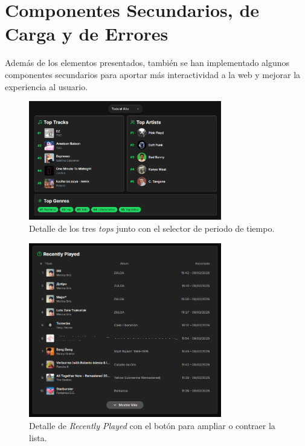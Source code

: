 \section{Componentes Secundarios, de Carga y de Errores}

Además de los elementos presentados, también se han implementado algunos componentes secundarios para aportar más interactividad a la web y mejorar la experiencia al usuario.

\begin{figure}[H]
  \centering
  \includegraphics[width=0.75\textwidth]{figures/capturas_ui/tops_detalle.png}
  \caption{Detalle de los tres \textit{tops} junto con el selector de periodo de tiempo.}
  \label{fig:tops_detalle}
\end{figure}

\begin{figure}[H]
  \centering
  \vspace{-10pt}
  \includegraphics[width=0.75\textwidth]{figures/capturas_ui/recently_played.png}
  \caption{Detalle de \textit{Recently Played} con el botón para ampliar o contraer la lista.}
  \label{fig:recently_played}
\end{figure}


